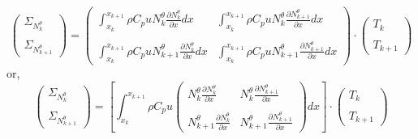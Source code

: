 \[
\left(
\begin{array}{c}
{\Sigma}_{N_k^\theta}  \\ \\ {\Sigma}_{N_{k+1}^\theta}
\end{array}
\right)
\!=\!
\left(
\begin{array}{cc}
\int_{x_k}^{x_{k+1}} \rho C_p u N_k^\theta \frac{\partial  N_{k}^\theta }{\partial x} dx  & 
\int_{x_k}^{x_{k+1}} \rho C_p u N_k^\theta \frac{\partial  N_{k+1}^\theta }{\partial x} dx \\ \\
\int_{x_k}^{x_{k+1}} \rho C_p u N_{k+1}^\theta \frac{\partial  N_{k}^\theta }{\partial x} dx  & 
\int_{x_k}^{x_{k+1}} \rho C_p u N_{k+1}^\theta \frac{\partial  N_{k+1}^\theta }{\partial x} dx 
\end{array}
\right)
\!\cdot\!
\left(
\begin{array}{c}
{T}_k \\ \\
{T}_{k+1}
\end{array}
\right)
\]
or,
\[
\left(
\begin{array}{c}
{\Sigma}_{N_k^\theta} \\ \\ {\Sigma}_{N_{k+1}^\theta}
\end{array}
\right)
\!=\!
\left[
\int_{x_k}^{x_{k+1}}
\rho C_p u
\left(
\begin{array}{cc}
N_k^\theta \frac{\partial     N_{k}^\theta }{\partial x}   & 
N_k^\theta \frac{\partial     N_{k+1}^\theta }{\partial x}  \\ \\
N_{k+1}^\theta \frac{\partial N_{k}^\theta }{\partial x}   & 
N_{k+1}^\theta \frac{\partial N_{k+1}^\theta }{\partial x} 
\end{array}
\right)
dx
\right]
\cdot
\left(
\begin{array}{c}
{T}_k \\ \\ 
{T}_{k+1}
\end{array}
\right)
\]

